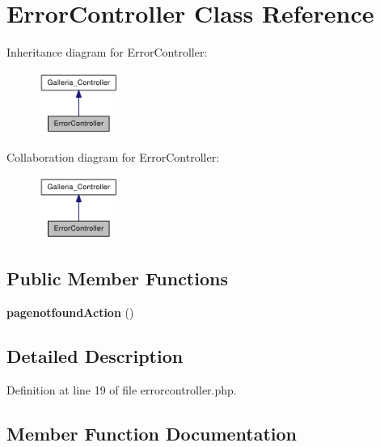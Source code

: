 \section{ErrorController Class Reference}
\label{classErrorController}
Inheritance diagram for ErrorController:\nopagebreak
\begin{figure}[H]
\begin{center}
\leavevmode
\includegraphics[width=74pt]{classErrorController__inherit__graph}
\end{center}
\end{figure}
Collaboration diagram for ErrorController:\nopagebreak
\begin{figure}[H]
\begin{center}
\leavevmode
\includegraphics[width=74pt]{classErrorController__coll__graph}
\end{center}
\end{figure}
\subsection*{Public Member Functions}
\begin{CompactItemize}
\item 
{\bf pagenotfoundAction} ()
\end{CompactItemize}


\subsection{Detailed Description}


Definition at line 19 of file errorcontroller.php.

\subsection{Member Function Documentation}
